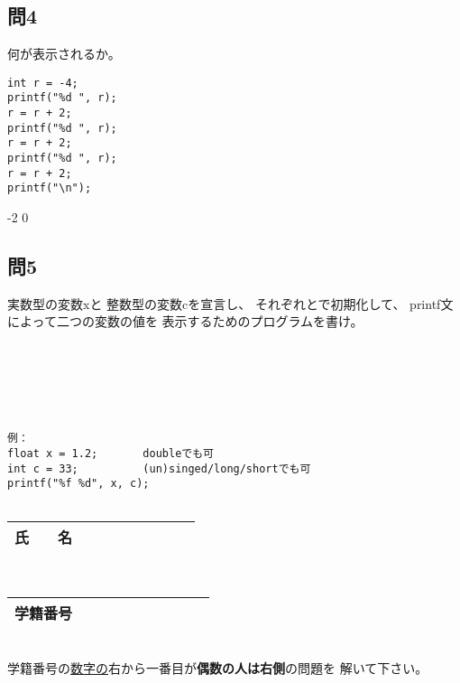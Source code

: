 \documentclass[a4j]{jarticle}
\def\an#1{\phantom{#1}}
\def\an#1{{#1}}
\begin{document}
\begin{multicols*}{2}
\subsection*{問4}

何が表示されるか。
\begin{verbatim}
int r = -4;
printf("%d ", r);
r = r + 2;
printf("%d ", r);
r = r + 2;
printf("%d ", r);
r = r + 2;
printf("\n");
\end{verbatim}
\an{ -2 0}



\subsection*{問5}


実数型の変数{\ttfamily x}と
整数型の変数{\ttfamily c}を宣言し、
それぞれ{}と{}で初期化して、
{\ttfamily printf}文によって二つの変数の値を
表示するためのプログラムを書け。

\ifnum {}
\begin{verbatim}






\end{verbatim}
\else
\begin{verbatim}
例：
float x = 1.2;       doubleでも可
int c = 33;          (un)singed/long/shortでも可
printf("%f %d", x, c);


\end{verbatim}
\fi


%






\vfill






\noindent
\begin{tabular}[t]{|c|cccccccc|}\hline
氏　　名 & & & & & & & & \\ \hline
\end{tabular}\\
\begin{tabular}[t]{|c|c|c|c|c|c|c|c|c|c|}\hline
学籍番号 & & & & & & & & \\ \hline
\end{tabular}\\
学籍番号の\underline{数字の}右から一番目が{\bfseries 偶数の人は右側}の問題を
解いて下さい。
\vspace{-5ex}






\end{multicols*}
\end{document}
